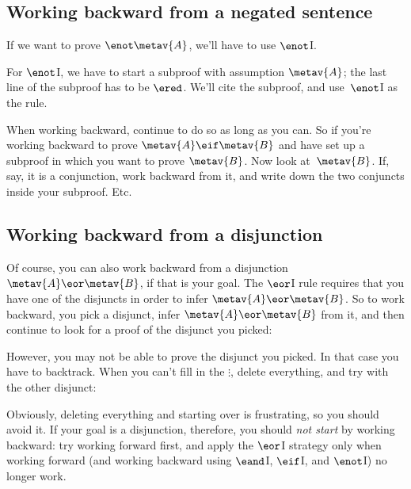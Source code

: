 \subsection*{Working backward from a negated sentence}

If we want to prove $\enot \metav{A}$, we'll have to use $\enot$I.
\begin{fitchproof}
\open
{}
\ellipsesline 
{}
\close
{}
\end{fitchproof} 
For $\enot$I, we have to start a subproof with assumption $\metav{A}$; the last line of the subproof has to be $\ered$.  We'll cite the subproof, and use~$\enot$I as the rule.

When working backward, continue to do so as long as you can. So if you're working backward to prove $\metav{A} \eif \metav{B}$ and have set up a subproof in which you want to prove $\metav{B}$. Now look at~$\metav{B}$. If, say, it is a conjunction, work backward from it, and write down the two conjuncts inside your subproof. Etc.

\subsection*{Working backward from a disjunction}

Of course, you can also work backward from a disjunction $\metav{A} \eor \metav{B}$, if that is your goal.
The $\eor$I rule requires that you have one of the disjuncts in order to infer $\metav{A} \eor \metav{B}$.
So to work backward, you pick a disjunct, infer $\metav{A} \eor \metav{B}$ from it, and then continue to look for a proof of the disjunct you picked:
\begin{fitchproof}
	\ellipsesline
\end{fitchproof}
However, you may not be able to prove the disjunct you picked. In that case you have to backtrack. When you can't fill in the $\vdots$, delete everything, and try with the other disjunct:
\begin{fitchproof}
	\ellipsesline 
\end{fitchproof}
Obviously, deleting everything and starting over is frustrating, so you should avoid it. If your goal is a disjunction, therefore, you should \emph{not start} by working backward: try working forward first, and apply the $\eor$I strategy only when working forward (and working backward using $\eand$I, $\eif$I, and $\enot$I) no longer work.

